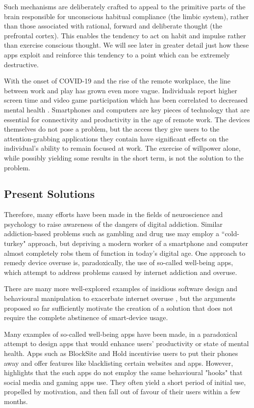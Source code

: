 Such mechanisms are deliberately crafted to appeal to the primitive parts of the brain responsible for unconscious habitual compliance (the limbic system), rather than those associated with rational, forward and deliberate thought (the prefrontal cortex). This enables the tendency to act on habit and impulse rather than exercise conscious thought. We will see later in greater detail just how these apps exploit and reinforce this tendency to a point which can be extremely destructive.

With the onset of COVID-19 and the rise of the remote workplace, the line between work and play has grown even more vague. Individuals report higher screen time and video game participation which has been correlated to decreased mental health \cite{colley2020exercise}. Smartphones and computers are key pieces of technology that are essential for connectivity and productivity in the age of remote work. The devices themselves do not pose a problem, but the access they give users to the attention-grabbing applications they contain have significant effects on the individual's ability to remain focused at work. The exercise of willpower alone, while possibly yielding some results in the short term, is not the solution to the problem.

\subsection{Present Solutions}
Therefore, many efforts have been made in the fields of neuroscience and psychology to raise awareness of the dangers of digital addiction. Similar addiction-based problems such as gambling and drug use may employ a ``cold-turkey" approach, but depriving a modern worker of a smartphone and computer almost completely robs them of function in today's digital age. One approach to remedy device overuse is, paradoxically, the use of so-called well-being apps, which attempt to address problems caused by internet addiction and overuse.

There are many more well-explored examples of insidious software design and behavioural manipulation to exacerbate internet overuse \cite{sagePaper2020}, but the arguments proposed so far sufficiently motivate the creation of a solution that does not require the complete abstinence of smart-device usage.

Many examples of so-called well-being apps have been made, in a paradoxical attempt to design apps that would enhance users' productivity or state of mental health. Apps such as BlockSite and Hold incentivise users to put their phones away and offer features like blacklisting certain websites and apps. However, \cite{sagePaper2020} highlights that the such apps do not employ the same behavioural "hooks" that social media and gaming apps use. They often yield a short period of initial use, propelled by motivation, and then fall out of favour of their users within a few months.

